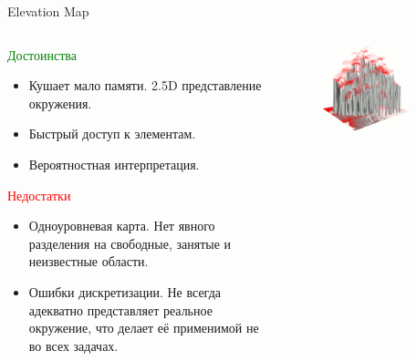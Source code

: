 \documentclass[9pt]{beamer}
\begin{document}
\begin{frame}{Elevation Map}
\begin{columns}
\begin{column}{0.60\textwidth}
  \begin{block}{\textcolor{green}{Достоинства}}
    \begin{itemize}
    \item
    { 
      Кушает мало памяти. 2.5D представление окружения.
    }
    \item
    {
      Быстрый доступ к элементам.
    }
    \item
    {
      Вероятностная интерпретация.
    }
    \end{itemize}
  \end{block}

  \begin{block}{\textcolor{red}{Недостатки}}
    \begin{itemize}
    \item
    { 
      Одноуровневая карта. Нет явного разделения на свободные, занятые и неизвестные области.
    }
    \item
    {
      Ошибки дискретизации. Не всегда адекватно представляет реальное окружение, что делает её применимой не во всех задачах.
    }
    \end{itemize}
  \end{block}
\end{column}
\begin{column}{0.40\textwidth}
\begin{figure}[h]
    \centering
    \includegraphics[width=0.8\textwidth]{elev_tree.png}
\end{figure}
\end{column}
\end{columns}
\end{frame}
\end{document}
